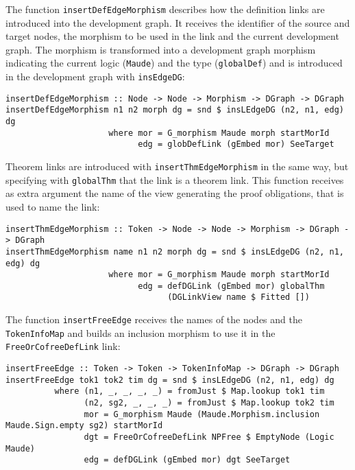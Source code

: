 The function \verb"insertDefEdgeMorphism" describes how the definition links
are introduced into the
development graph. It receives the identifier of the source and target
nodes, the morphism to be used in the link and the current development
graph. The morphism is transformed into a development graph morphism
indicating the current logic (\verb"Maude") and the type (\verb"globalDef")
and is introduced in the development graph with \verb"insEdgeDG":

{\codesize
\begin{verbatim}
insertDefEdgeMorphism :: Node -> Node -> Morphism -> DGraph -> DGraph
insertDefEdgeMorphism n1 n2 morph dg = snd $ insLEdgeDG (n2, n1, edg) dg
                     where mor = G_morphism Maude morph startMorId
                           edg = globDefLink (gEmbed mor) SeeTarget
\end{verbatim}
}

Theorem links are introduced with \verb"insertThmEdgeMorphism"
in the same way, but specifying with
\verb"globalThm" that the link is a theorem link. This function receives
as extra argument the name of the view generating the proof obligations,
that is used to name the link:

{\codesize
\begin{verbatim}
insertThmEdgeMorphism :: Token -> Node -> Node -> Morphism -> DGraph -> DGraph
insertThmEdgeMorphism name n1 n2 morph dg = snd $ insLEdgeDG (n2, n1, edg) dg
                     where mor = G_morphism Maude morph startMorId
                           edg = defDGLink (gEmbed mor) globalThm
                                 (DGLinkView name $ Fitted [])
\end{verbatim}
}

The function \verb"insertFreeEdge" receives the names of the nodes and
the \verb"TokenInfoMap" and builds an inclusion morphism to use it in
the \verb"FreeOrCofreeDefLink" link:

{\codesize
\begin{verbatim}
insertFreeEdge :: Token -> Token -> TokenInfoMap -> DGraph -> DGraph
insertFreeEdge tok1 tok2 tim dg = snd $ insLEdgeDG (n2, n1, edg) dg
          where (n1, _, _, _, _) = fromJust $ Map.lookup tok1 tim
                (n2, sg2, _, _, _) = fromJust $ Map.lookup tok2 tim
                mor = G_morphism Maude (Maude.Morphism.inclusion Maude.Sign.empty sg2) startMorId
                dgt = FreeOrCofreeDefLink NPFree $ EmptyNode (Logic Maude)
                edg = defDGLink (gEmbed mor) dgt SeeTarget
\end{verbatim}
}























